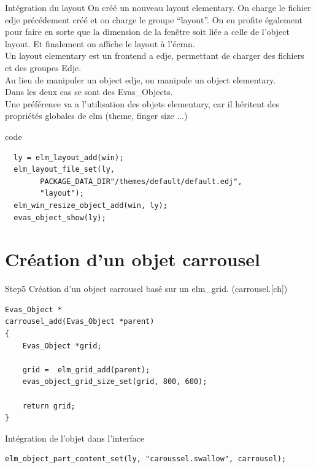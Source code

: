 \documentclass{beamer}
\begin{document}
\begin{frame}[fragile]{Intégration du layout}
On créé un nouveau layout elementary. On charge le fichier edje précédement créé et on charge le groupe ``layout''.
On en profite également pour faire en sorte que la dimension de la fenêtre soit liée a celle de l'object layout.
Et finalement on affiche le layout à l'écran.\\
Un layout elementary est un frontend a edje, permettant de charger des fichiers et des groupes Edje.\\
Au lieu de manipuler un object edje, on manipule un object elementary.\\
Dans les deux cas se sont des Evas\_Objects.\\
Une préférence va a l'utilisation des objets elementary, car il héritent des propriétés globales de elm (theme, finger size ...)
\end{frame}

\begin{frame}[fragile]{code}
\begin{lstlisting}
  ly = elm_layout_add(win);
  elm_layout_file_set(ly,
        PACKAGE_DATA_DIR"/themes/default/default.edj",
        "layout");
  elm_win_resize_object_add(win, ly);
  evas_object_show(ly);
\end{lstlisting}
\end{frame}

\section{Création d'un objet carrousel}
\begin{frame}[fragile]{Step5}
Création d'un object carrousel basé sur un elm\_grid. (carrousel.[ch])
\begin{lstlisting}
Evas_Object *
carrousel_add(Evas_Object *parent)
{
    Evas_Object *grid;

    grid =  elm_grid_add(parent);
    evas_object_grid_size_set(grid, 800, 600);

    return grid;
}
\end{lstlisting}
Intégration de l'objet dans l'interface
\begin{lstlisting}
elm_object_part_content_set(ly, "caroussel.swallow", carrousel);
\end{lstlisting}
\end{frame}
\end{document}
